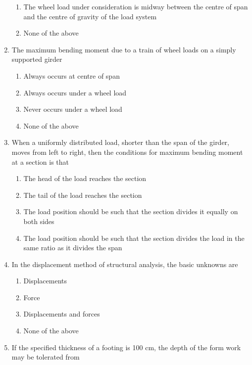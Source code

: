 \documentclass[11pt,a4paper]{article}
\begin{document}
\begin{enumerate}
\begin{enumerate}[label=\Alph*.]
\item{The wheel load under consideration is midway between the centre of span and the centre of gravity of the load system}
\item{None of the above}
\end{enumerate}
\item{The maximum bending moment due to a train of wheel loads on a simply supported girder}
\begin{enumerate}[label=\Alph*.]
\item{Always occurs at centre of span}
\item{Always occurs under a wheel load}
\item{Never occurs under a wheel load}
\item{None of the above}
\end{enumerate}
\item{When a uniformly distributed load, shorter than the span of the girder, moves from left to right, then the conditions for maximum bending moment at a section is that}
\begin{enumerate}[label=\Alph*.]
\item{The head of the load reaches the section}
\item{The tail of the load reaches the section}
\item{The load position should be such that the section divides it equally on both sides}
\item{The load position should be such that the section divides the load in the same ratio as it divides the span}
\end{enumerate}
\item{In the displacement method of structural analysis, the basic unknowns are}
\begin{enumerate}[label=\Alph*.]
\item{Displacements}
\item{Force}
\item{Displacements and forces}
\item{None of the above}
\end{enumerate}
\item{If the specified thickness of a footing is 100 cm, the depth of the form work may be tolerated from}
\\
\end{enumerate}
\end{document}
